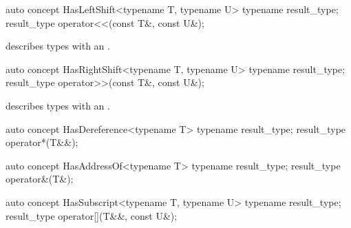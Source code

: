 \documentclass[american,twoside]{book}
\begin{document}
\begin{itemdescr}
\pnum
{}
\end{itemdescr}

\begin{itemdecl}
auto concept HasLeftShift<typename T, typename U> {
  typename result_type;
  result_type operator<<(const T&, const U&);
}
\end{itemdecl}

\begin{itemdescr}
\pnum
\mbox{\reallynote} describes types with an \mbox{}.
\end{itemdescr}

\begin{itemdecl}
auto concept HasRightShift<typename T, typename U> {
  typename result_type;
  result_type operator>>(const T&, const U&);
}
\end{itemdecl}

\begin{itemdescr}
\pnum
\mbox{\reallynote} describes types with an \mbox{}.
\end{itemdescr}

\begin{itemdecl}
auto concept HasDereference<typename T> {
  typename result_type;
  result_type operator*(T&&);
}
\end{itemdecl}

\begin{itemdescr}
\pnum
{}
\end{itemdescr}

\begin{itemdecl}
auto concept HasAddressOf<typename T> {
  typename result_type;
  result_type operator&(T&);
}
\end{itemdecl}

\begin{itemdescr}
\pnum
{}
\end{itemdescr}

\begin{itemdecl}
auto concept HasSubscript<typename T, typename U> {
  typename result_type;
  result_type operator[](T&&, const U&);
}
\end{itemdecl}

\begin{itemdescr}
\pnum
{}
\end{itemdescr}
\end{document}
